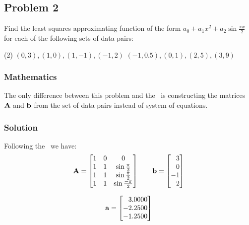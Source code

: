 \subsection{Problem 2}%
\label{sec:problem_2}
Find the least squares approximating function of the form
$a_0+a_1x^2+a_2\sin{\frac{\pi{}x}{2}}$ for each of the following sets of data pairs:
\begin{tasks}(2)
  \task $(0,3),(1,0),(1,-1),(-1,2)$
  \task $(-1,0.5),(0,1),(2,5),(3,9)$
\end{tasks}
\subsubsection*{Mathematics}
The only difference between this problem and the~ is constructing
the matrices $\mathbf{A}$ and $\mathbf{b}$ from the set of data pairs instead of system of
equations.
\subsubsection*{Solution}
Following the~ we have:
\begin{equation*}
  \mathbf{A} = \begin{bmatrix}
    1 & 0 & 0 \\
    1 & 1 & \sin{\frac{\pi}{2}} \\
    1 & 1 & \sin{\frac{\pi}{2}} \\
    1 & 1 & \sin{\frac{-\pi}{2}}
  \end{bmatrix} \qquad
  \mathbf{b} = \begin{bmatrix}
    \phantom{-}3 \\
    \phantom{-}0 \\
    -1 \\
    \phantom{-}2
  \end{bmatrix}
\end{equation*}

\begin{equation*}
  \mathbf{a} = \begin{bmatrix}
    \phantom{-}3.0000 \\
    -2.2500 \\
    -1.2500
  \end{bmatrix}
\end{equation*}

